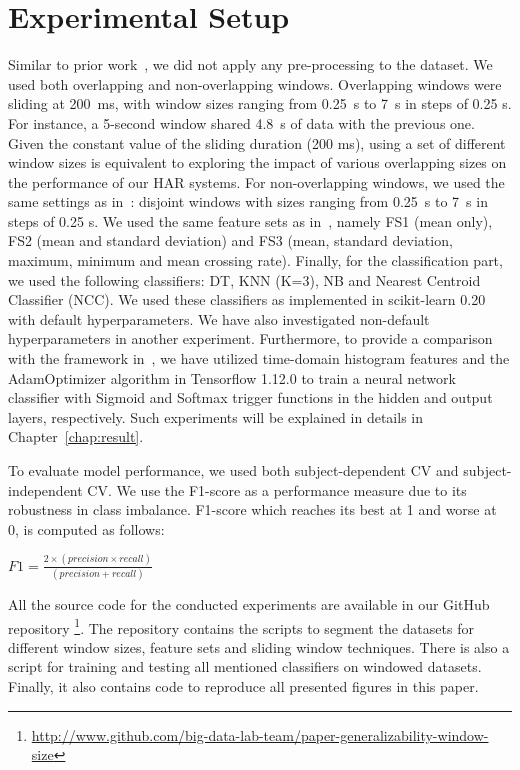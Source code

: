 \section{Experimental Setup} \label{sec:experiment setup}
Similar to prior work~\cite{banos2014window}, we did not apply any pre-processing to the dataset. We used both overlapping and non-overlapping windows. Overlapping windows were sliding at 200~ms, with window sizes ranging from 0.25~s to 7~s in steps of 0.25 s. For instance, a 5-second window shared 4.8~s of data with the previous one.  Given the constant value of the sliding duration (200 ms), using a set of different window sizes is equivalent to exploring the impact of various overlapping sizes on the performance of our HAR systems. For non-overlapping windows, we used the same settings as in~\cite{banos2014window}: disjoint windows with sizes ranging from 0.25~s to 7~s in steps of 0.25 s. We used the same feature sets as in~\cite{banos2014window}, namely FS1 (mean only), FS2 (mean and standard deviation) and FS3 (mean, standard deviation, maximum, minimum and mean crossing rate). Finally, for the classification part, we used the following classifiers: DT, KNN (K=3), NB and Nearest Centroid Classifier (NCC). We used these classifiers as implemented in scikit-learn 0.20~\cite{pedregosa2011scikit} with default hyperparameters. We have also investigated non-default hyperparameters in another experiment. Furthermore, to provide a comparison with the framework in~\cite{omid2019MPR}, we have utilized time-domain histogram features and the AdamOptimizer algorithm in Tensorflow 1.12.0 to train a neural network classifier with Sigmoid and Softmax trigger functions in the hidden and output layers, respectively. Such experiments will be explained in details in Chapter~\ref{chap:result}.
 
To evaluate model performance, we used both subject-dependent CV and subject-independent CV. We use the F1-score as a performance measure due to its robustness in class imbalance. F1-score which reaches its best at 1 and worse at 0, is computed as follows:
 \begin{center}
      $F1= \frac{2\times(precision \times recall)}{(precision + recall)}$
 \end{center}

All the source code for the conducted experiments are available in our GitHub repository \footnote{\url{http://www.github.com/big-data-lab-team/paper-generalizability-window-size}}. The repository contains the scripts to segment the datasets for different window sizes, feature sets and sliding window techniques. There is also a script for training and testing all mentioned classifiers on windowed datasets. Finally, it also contains code to reproduce all presented figures in this paper.

